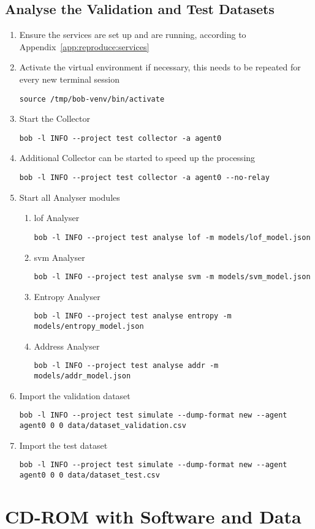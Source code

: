 \section{Analyse the Validation and Test Datasets}
\label{app:reproduce:run}

\begin{enumerate}
	\item Ensure the services are set up and are running, according to Appendix~\ref{app:reproduce:services}
	\item Activate the virtual environment if necessary, this needs to be repeated for every new terminal session
\begin{lstlisting}
source /tmp/bob-venv/bin/activate
\end{lstlisting}
	\item Start the Collector
\begin{lstlisting}
bob -l INFO --project test collector -a agent0
\end{lstlisting}
	\item Additional Collector can be started to speed up the processing
\begin{lstlisting}
bob -l INFO --project test collector -a agent0 --no-relay
\end{lstlisting}
	\item Start all Analyser modules
		\begin{enumerate}
			\item \gls{lof} Analyser
\begin{lstlisting}
bob -l INFO --project test analyse lof -m models/lof_model.json
\end{lstlisting}
			\item \gls{svm} Analyser
\begin{lstlisting}
bob -l INFO --project test analyse svm -m models/svm_model.json
\end{lstlisting}
			\item Entropy Analyser
\begin{lstlisting}
bob -l INFO --project test analyse entropy -m models/entropy_model.json
\end{lstlisting}
			\item Address Analyser
\begin{lstlisting}
bob -l INFO --project test analyse addr -m models/addr_model.json
\end{lstlisting}
		\end{enumerate}
	\item Import the validation dataset
\begin{lstlisting}
bob -l INFO --project test simulate --dump-format new --agent agent0 0 0 data/dataset_validation.csv
\end{lstlisting}
	\item Import the test dataset
\begin{lstlisting}
bob -l INFO --project test simulate --dump-format new --agent agent0 0 0 data/dataset_test.csv
\end{lstlisting}
\end{enumerate}

\begin{comment}
\begin{lstlisting}
\end{lstlisting}
\end{comment}

\chapter{CD-ROM with Software and Data}
\label{app:disk}